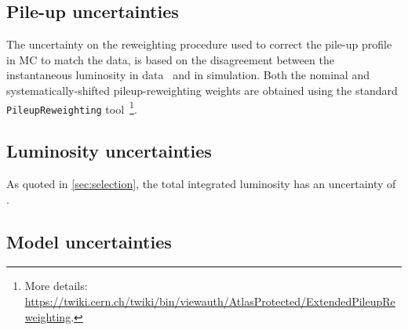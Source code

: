 \subsection*{Pile-up uncertainties}

The uncertainty on the reweighting procedure used to correct the pile-up profile in MC to match the data, is based on the disagreement between the instantaneous luminosity in data~\cite{DAPR-2013-01} and in simulation. Both the nominal and systematically-shifted pileup-reweighting weights are obtained using the standard \texttt{PileupReweighting} tool~\footnote{More details: \url{https://twiki.cern.ch/twiki/bin/viewauth/AtlasProtected/ExtendedPileupReweighting}.}. 

\subsection*{Luminosity uncertainties}

As quoted in \cref{sec:selection}, the total integrated luminosity has an uncertainty of \intlumiunc.



\subsection{Model uncertainties}
\label{sec:theoretical_uncertainties}


